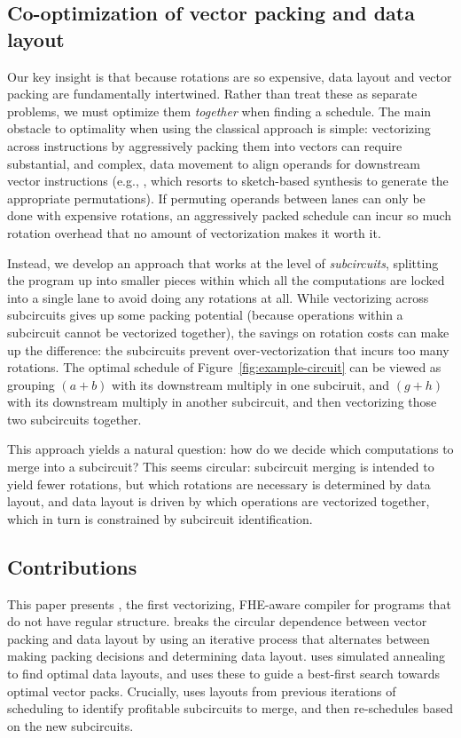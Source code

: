 \subsection*{Co-optimization of vector packing and data layout}
Our key insight is that because rotations are so expensive, data layout and vector packing are fundamentally intertwined. Rather than treat these as separate problems, we must optimize them {\em together} when finding a schedule.
The main obstacle to optimality when using the classical approach is simple: vectorizing across instructions by aggressively packing them into vectors can require substantial, and complex, data movement to align operands for downstream vector instructions (e.g., \citet{SwizzleInventor}, which resorts to sketch-based synthesis to generate the appropriate permutations). If permuting operands between lanes can only be done with expensive rotations, an aggressively packed schedule can incur so much rotation overhead that no amount of vectorization makes it worth it.

Instead, we develop an approach that works at the level of {\em subcircuits}, splitting the program up into smaller pieces within which all the computations are locked into a single lane to avoid doing any rotations at all. While vectorizing across subcircuits gives up some packing potential (because operations within a subcircuit cannot be vectorized together), the savings on rotation costs can make up the difference: the subcircuits prevent over-vectorization that incurs too many rotations. The optimal schedule of Figure~\ref{fig:example-circuit} can be viewed as grouping $(a + b)$ with its downstream multiply in one subciruit, and $(g + h)$ with its downstream multiply in another subcircuit, and then vectorizing those two subcircuits together.

This approach yields a natural question: how do we decide which computations to merge into a subcircuit? This seems circular: subcircuit merging is intended to yield fewer rotations, but which rotations are necessary is determined by data layout, and data layout is driven by which operations are vectorized together, which in turn is constrained by subcircuit identification. 


\subsection*{Contributions}

This paper presents \system, the first vectorizing, FHE-aware compiler for programs that do not have regular structure. \system breaks the circular dependence between vector packing and data layout by using an iterative process that alternates between making packing decisions and determining data layout. \system uses simulated annealing to find optimal data layouts, and uses these to guide a best-first search towards optimal vector packs. Crucially, \system uses layouts from previous iterations of scheduling to identify profitable subcircuits to merge, and then re-schedules based on the new subcircuits.


